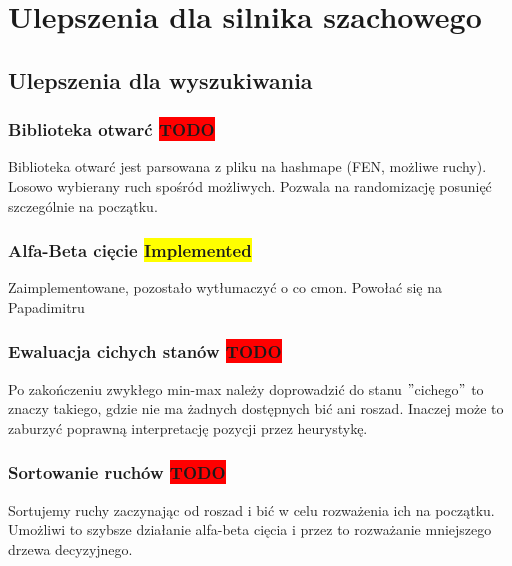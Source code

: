 \usepackage{color}\chapter{Ulepszenia dla silnika szachowego}
\label{ch:implementacja-silnika-szachowego}


\section{Ulepszenia dla wyszukiwania}
\label{sec:ulepszenia-dla-wyszukiwania}

\subsection{Biblioteka otwarć \colorbox{red}{TODO}}
\label{subsec:biblioteka-otwarc}

{
    \color{red}
    \large Biblioteka otwarć jest parsowana z pliku na hashmape (FEN, możliwe ruchy).
    Losowo wybierany ruch spośród możliwych.
    Pozwala na randomizację posunięć szczególnie na początku.

}

\subsection{Alfa-Beta cięcie \colorbox{yellow}{Implemented}}
\label{subsec:alfa-beta-ciecie}

{
    \color{red}
    \large Zaimplementowane, pozostało wytłumaczyć o co cmon.
Powołać się na Papadimitru
}


\subsection{Ewaluacja cichych stanów \colorbox{red}{TODO}}
\label{subsec:ewaluacja-cichych-stanow}

{
    \color{red}
    \large Po zakończeniu zwykłego min-max należy doprowadzić do stanu \("\)cichego\("\) to znaczy takiego, gdzie nie ma żadnych dostępnych bić ani roszad.
Inaczej może to zaburzyć poprawną interpretację pozycji przez heurystykę.
}


\subsection{Sortowanie ruchów \colorbox{red}{TODO}}
\label{subsec:sortowanie-ruchow}

{
    \color{red}
    \large Sortujemy ruchy zaczynając od roszad i bić w celu rozważenia ich na początku.
    Umożliwi to szybsze działanie alfa-beta cięcia i przez to rozważanie mniejszego drzewa decyzyjnego.
}

